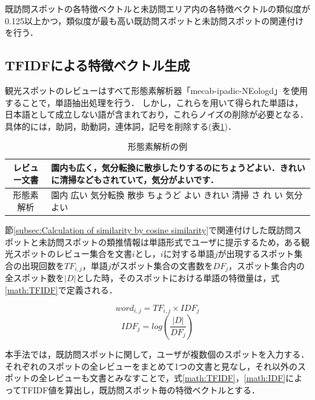 \documentclass{deimj}
\begin{document}
既訪問スポットの各特徴ベクトルと未訪問エリア内の各特徴ベクトルの類似度が0.125以上かつ，類似度が最も高い既訪問スポットと未訪問スポットの関連付けを行う．

\subsection{TFIDFによる特徴ベクトル生成}
\label{subsec:Feature vector generation by TFIDF}
観光スポットのレビューはすべて形態素解析器「mecab-ipadic-NEologd」を使用することで，単語抽出処理を行う．
しかし，これらを用いて得られた単語は，日本語として成立しない語が含まれており，これらノイズの削除が必要となる．
具体的には，助詞，助動詞，連体詞，記号を削除する(表\ref{table:mecab})．

\begin{table}[t]
  \caption{形態素解析の例}
  \label{table:mecab}
  \centering
    \begin{tabular}{c|p{}} \hline
      レビュー文書 & 園内も広く，気分転換に散歩したりするのにちょうどよい．きれいに清掃などもされていて，気分がよいです．\\
      \hline
      形態素解析 & 園内 広い 気分転換 散歩 ちょうど よい きれい 清掃 さ れ い 気分 よい\\
      \hline
    \end{tabular}
\end{table}

節\ref{subsec:Calculation of similarity by cosine similarity}で関連付けした既訪問スポットと未訪問スポットの類推情報は単語形式でユーザに提示するため，ある観光スポットのレビュー集合を文書$i$とし，$i$に対する単語$j$が出現するスポット集合の出現回数を$TF_{i,j}$，単語$j$がスポット集合の文書数を$DF_{j}$，スポット集合内の全スポット数を$|D|$とした時，そのスポットにおける単語の特徴量は，式\ref{math:TFIDF}で定義される．

\begin{equation}
  word_{i,j} = TF_{i,j} \times IDF_{j}
  \label{math:TFIDF}
\end{equation}
\begin{equation}
  IDF_{j} = log(\frac{|D|}{DF_{j}})
  \label{math:IDF}
\end{equation}

本手法では，既訪問スポットに関して，ユーザが複数個のスポットを入力する．
それぞれのスポットの全レビューをまとめて1つの文書と見なし，それ以外のスポットの全レビューも文書とみなすことで，式\ref{math:TFIDF}，\ref{math:IDF}によってTFIDF値を算出し，既訪問スポット毎の特徴ベクトルとする．
\end{document}
